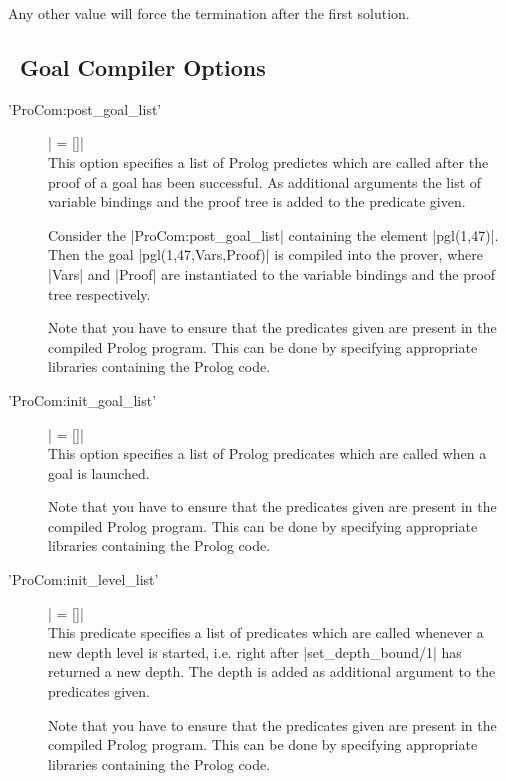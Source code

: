 \begin{description}
  Any other value will force the termination after the first solution.

\end{description}

\subsection{\ProCom\ Goal Compiler Options}


\begin{description}
  \item ['ProCom:post\_goal\_list'] | = []|
    \\
    This option specifies a list of Prolog predictes which are called after
    the proof of a goal has been successful. As additional arguments the list
    of variable bindings and the proof tree is added to the predicate given.

    Consider the |ProCom:post_goal_list| containing the element |pgl(1,47)|.
    Then the goal |pgl(1,47,Vars,Proof)| is compiled into the prover, where
    |Vars| and |Proof| are instantiated to the variable bindings and the proof
    tree respectively.

    Note that you have to ensure that the predicates given are present in the
    compiled Prolog program. This can be done by specifying appropriate
    libraries containing the Prolog code.

  \item ['ProCom:init\_goal\_list'] | = []|
    \\
    This option specifies a list of Prolog predicates which are called when a
    goal is launched.

    Note that you have to ensure that the predicates given are present in the
    compiled Prolog program. This can be done by specifying appropriate
    libraries containing the Prolog code.

  \item ['ProCom:init\_level\_list'] | = []|
    \\
    This predicate specifies a list of predicates which are called whenever a
    new depth level is started, i.e. right after |set_depth_bound/1| has
    returned a new depth. The depth is added as additional argument to the
    predicates given.

    Note that you have to ensure that the predicates given are present in the
    compiled Prolog program. This can be done by specifying appropriate
    libraries containing the Prolog code.

\end{description}


